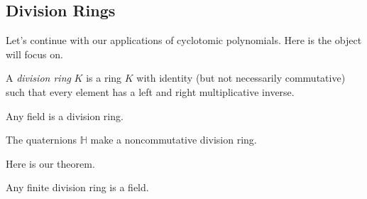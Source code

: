 \subsection{Division Rings}
Let's continue with our applications of cyclotomic polynomials. Here is the object will focus on.
\begin{definition}
	A \textit{division ring} $K$ is a ring $K$ with identity (but not necessarily commutative) such that every element has a left and right multiplicative inverse.
\end{definition}
\begin{example}
	Any field is a division ring.
\end{example}
\begin{example}
	The quaternions $\mathbb H$ make a noncommutative division ring.
\end{example}
Here is our theorem.
\begin{theorem}[Wedderburn]
	Any finite division ring is a field.
\end{theorem}

